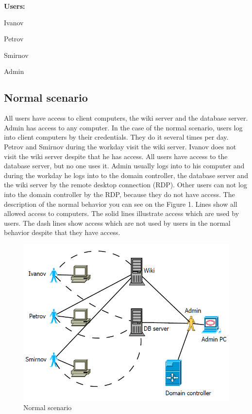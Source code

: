 \begin{compactitem}
\item [\textbf{Users:}]
\item Ivanov
\item Petrov
\item Smirnov
\item Admin
\end{compactitem}
     
\subsection{Normal scenario}
All users have access to client computers, the wiki server and the database server. Admin has access to any computer. In the case of the normal scenario, users log into client computers by their credentials. They do it several times per day. Petrov and Smirnov during the workday visit the wiki server. Ivanov does not visit the wiki server despite that he has access. All users have access to the database server, but no one uses it. Admin usually logs into to his computer and during the workday he logs into to the domain controller, the database server and the wiki server by the remote desktop connection (RDP). Other users can not log into the domain controller by the RDP, because they do not have access. The description of the normal behavior you can see on the Figure 1. Lines show all allowed access to computers. The solid lines illustrate access which are used by users. The dash lines show access which are not used by users in the normal behavior despite that they have access. 
\begin{figure}[ht!]
\centering
\includegraphics[width=\textwidth]{scenario_normal.png}
\caption{Normal scenario}
\label{overflow}
\end{figure}

